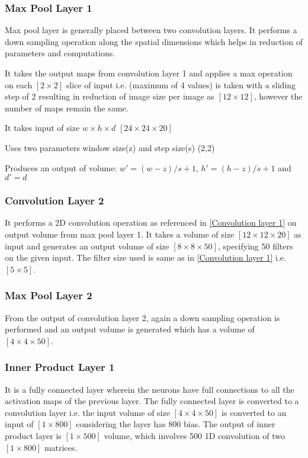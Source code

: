 \subsubsection{Max Pool Layer 1}\label{Max Pool layer 1}
Max pool layer is generally placed between two convolution layers. It performs a down sampling operation along the spatial dimensions which helps in reduction of parameters and computations. 

It takes the output maps from convolution layer 1 and applies a max operation on each $[2\times 2]$ slice of input i.e. (maximum of 4 values) is taken with a sliding step of 2 resulting in reduction of image size per image as $[12\times 12]$, however the number of maps remain the same.

\noindent It takes input of size $w\times h\times d$ $[24\times 24\times 20]$

\noindent Uses two parameters window size(z) and step size(s)  (2,2)

\noindent Produces an output of volume: $w'= (w-z)/s+1$, $h'= (h-z)/s+1$ and $d'=d$
\subsubsection{Convolution Layer 2}\label{Convolution layer 2}
It performs a 2D convolution operation as referenced in \ref{Convolution layer 1} on output volume from max pool layer 1. It takes a volume of size $[12\times 12\times 20]$ as input and generates an output volume of size $[8\times 8\times 50]$, specifying 50 filters on the given input. The filter size used is same as in \ref{Convolution layer 1} i.e. $[5\times 5]$.
\subsubsection{Max Pool Layer 2}\label{Max Pool layer 2}
From the output of convolution layer 2, again a down sampling operation is performed and an output volume is generated which has a volume of $[4\times 4\times 50]$.
\subsubsection{Inner Product Layer 1}\label{Inner Product Layer 1}
It is a fully connected layer wherein the neurons have full connections to all the  activation maps of the previous layer. The fully connected layer is converted to a convolution layer i.e. the input volume of size $[4\times 4\times 50]$ is converted to an input of $[1\times 800]$ considering the layer has 800 bias. The output of inner product layer is $[1\times 500]$ volume, which  involves 500 1D convolution of two $[1\times 800]$ matrices.
